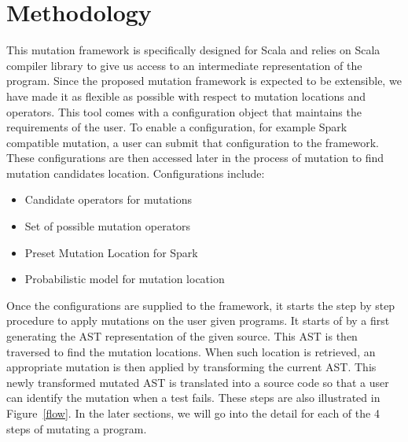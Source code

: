 \section{Methodology}



This mutation framework is specifically designed for Scala and relies on Scala compiler library to give us access to an intermediate representation of the program. Since the proposed mutation framework is expected to be extensible, we have made it as flexible as possible with respect to mutation locations and operators. This tool comes with a configuration object that maintains the requirements of the user.  To enable a configuration, for example Spark compatible mutation, a user can submit that configuration to the framework. These configurations are then accessed later in the process of mutation to find mutation candidates location. Configurations include: 
\begin{itemize}
\item Candidate operators for mutations
\item Set of possible mutation operators
\item Preset Mutation Location for Spark
\item Probabilistic model for mutation location 
\end{itemize}

Once the configurations are supplied to the framework, it starts the step by step procedure to apply mutations on the user given programs. It starts of by a first generating the AST representation of the given source. This AST is then traversed to find the mutation locations. When such location is retrieved, an appropriate mutation is then applied by transforming the current AST. This newly transformed mutated AST is translated into a source code so that a user can identify the mutation when a test fails. These steps are also illustrated in Figure~\ref{flow}. In the later sections, we will go into the detail for each of the 4 steps of mutating a program.

